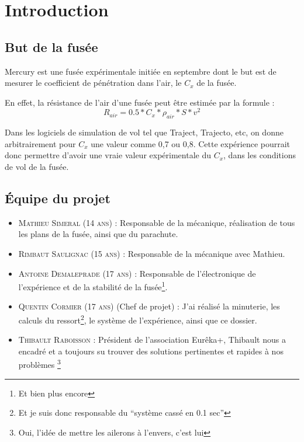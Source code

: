 \documentclass[a4paper,12pt]{scrartcl}
\begin{document}
	
    \newpage
    \tableofcontents
    \newpage
	  \section{Introduction}
	      \subsection{But de la fusée}
		Mercury est une fusée expérimentale initiée en septembre dont le but est de mesurer le coefficient de pénétration dans l'air, 
		le $C_x$ de la fusée.

		En effet, la résistance de l'air d'une fusée peut être estimée par la formule : 
		$$ R_{air} = 0.5 * C_x * \rho_{air} * S * v^2$$

		Dans les logiciels de simulation de vol tel que Traject, Trajecto, etc, on donne arbitrairement pour $C_x$ une valeur comme 0,7 ou 0,8.
		Cette expérience pourrait donc permettre d'avoir une vraie valeur expérimentale du $C_x$, dans les conditions de vol de la fusée.

	      \subsection{Équipe du projet}
		 \begin{itemize}
		  \item \textsc{Mathieu Simeral (14 ans)} : Responsable de la mécanique, réalisation de tous les plans de la fusée, ainsi que du parachute.
		  \item \textsc{Rimbaut Saulignac (15 ans)} : Responsable de la mécanique avec Mathieu.
		  \item \textsc{Antoine Demaleprade (17 ans)} : Responsable de l'électronique de l'expérience et de la stabilité de la fusée\footnote{Et bien plus encore}.
		  \item \textsc{Quentin Cormier (17 ans)} (Chef de projet) : J'ai réalisé la minuterie, les calculs du ressort\footnote{Et je suis donc responsable du ``système cassé en 0.1 sec''}, le système de l'expérience, ainsi que ce dossier.
		  \item \textsc{Thibault Raboisson} : Président de l'association Eurêka+, Thibault nous a encadré et a toujours su trouver des solutions pertinentes et rapides à nos problèmes \footnote{Oui, l'idée de mettre les ailerons à l'envers, c'est lui}
		 \end{itemize}
\end{document}
